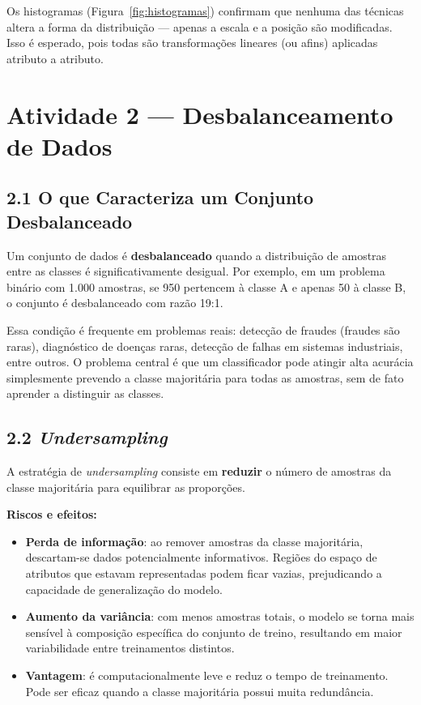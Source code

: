 \documentclass[12pt,a4paper]{article}
\begin{document}
Os histogramas (Figura~\ref{fig:histogramas}) confirmam que nenhuma das técnicas altera a forma da distribuição --- apenas a escala e a posição são modificadas. Isso é esperado, pois todas são transformações lineares (ou afins) aplicadas atributo a atributo.


\newpage
\section*{Atividade 2 --- Desbalanceamento de Dados}

\subsection*{2.1 O que Caracteriza um Conjunto Desbalanceado}

Um conjunto de dados é \textbf{desbalanceado} quando a distribuição de amostras entre as classes é significativamente desigual. Por exemplo, em um problema binário com 1.000 amostras, se 950 pertencem à classe A e apenas 50 à classe B, o conjunto é desbalanceado com razão 19:1.

Essa condição é frequente em problemas reais: detecção de fraudes (fraudes são raras), diagnóstico de doenças raras, detecção de falhas em sistemas industriais, entre outros. O problema central é que um classificador pode atingir alta acurácia simplesmente prevendo a classe majoritária para todas as amostras, sem de fato aprender a distinguir as classes.

\subsection*{2.2 \textit{Undersampling}}

A estratégia de \textit{undersampling} consiste em \textbf{reduzir} o número de amostras da classe majoritária para equilibrar as proporções.

\textbf{Riscos e efeitos:}
\begin{itemize}[nosep]
    \item \textbf{Perda de informação}: ao remover amostras da classe majoritária, descartam-se dados potencialmente informativos. Regiões do espaço de atributos que estavam representadas podem ficar vazias, prejudicando a capacidade de generalização do modelo.
    \item \textbf{Aumento da variância}: com menos amostras totais, o modelo se torna mais sensível à composição específica do conjunto de treino, resultando em maior variabilidade entre treinamentos distintos.
    \item \textbf{Vantagem}: é computacionalmente leve e reduz o tempo de treinamento. Pode ser eficaz quando a classe majoritária possui muita redundância.
\end{itemize}
\end{document}
